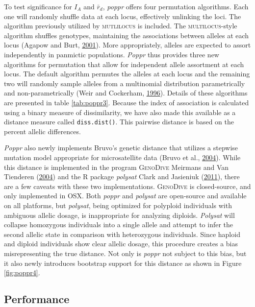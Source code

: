 \documentclass[double,12pt]{beavtex}
\begin{document}
  To test significance for \(I_A\) and \(\bar{r}_d\), \emph{poppr} offers
  four permutation algorithms. Each one will randomly shuffle data at each
  locus, effectively unlinking the loci. The algorithm previously utilized
  by \textsc{mutlilocus} is included. The \textsc{multilocus}-style
  algorithm shuffles genotypes, maintaining the associations between
  alleles at each locus (Agapow and Burt,
  \protect\hyperlink{ref-Agapow_2001}{2001}). More appropriately, alleles
  are expected to assort independently in panmictic populations.
  \emph{Poppr} thus provides three new algorithms for permutation that
  allow for independent allele assortment at each locus. The default
  algorithm permutes the alleles at each locus and the remaining two will
  randomly sample alleles from a multinomial distribution parametrically
  and non-parametrically (Weir and Cockerham,
  \protect\hyperlink{ref-weir1996genetic}{1996}). Details of these
  algorithms are presented in table \ref{tab:poppr3}. Because the index of
  association is calculated using a binary measure of dissimilarity, we
  have also made this available as a distance measure called
  \texttt{diss.dist()}. This pairwise distance is based on the percent
  allelic differences.
  
  \emph{Poppr} also newly implements Bruvo's genetic distance that
  utilizes a stepwise mutation model appropriate for microsatellite data
  (Bruvo et al., \protect\hyperlink{ref-bruvo2004simple}{2004}). While
  this distance is implemented in the program \textsc{ GenoDive} Meirmans
  and Van Tienderen (\protect\hyperlink{ref-meirmans2004genotype}{2004})
  and the R package \emph{polysat} Clark and Jasieniuk
  (\protect\hyperlink{ref-polysat}{2011}), there are a few caveats with
  these two implementations. \textsc{GenoDive} is closed-source, and only
  implemented in OSX. Both \emph{poppr} and \emph{polysat} are open-source
  and available on all platforms, but \emph{polysat}, being optimized for
  polyploid individuals with ambiguous allelic dosage, is inappropriate
  for analyzing diploids. \emph{Polysat} will collapse homozygous
  individuals into a single allele and attempt to infer the second allelic
  state in comparison with heterozygous individuals. Since haploid and
  diploid individuals show clear allelic dosage, this procedure creates a
  bias misrepresenting the true distance. Not only is \emph{poppr} not
  subject to this bias, but it also newly introduces bootstrap support for
  this distance as shown in Figure \ref{fig:poppr4}.
  
  \subsection{Performance}\label{performance-1}
  
\end{document}
